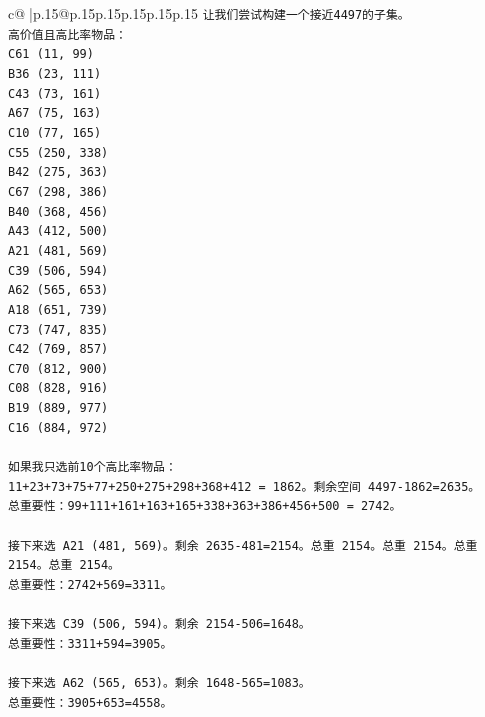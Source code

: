 \documentclass{article}
\begin{document}
{\begin{supertabular}{c@{$\;$}|p{.15\linewidth}@{}p{.15\linewidth}p{.15\linewidth}p{.15\linewidth}p{.15\linewidth}p{.15\linewidth}}
{{{\texttt{让我们尝试构建一个接近4497的子集。} \\
\texttt{高价值且高比率物品：} \\
\texttt{C61 (11, 99)} \\
\texttt{B36 (23, 111)} \\
\texttt{C43 (73, 161)} \\
\texttt{A67 (75, 163)} \\
\texttt{C10 (77, 165)} \\
\texttt{C55 (250, 338)} \\
\texttt{B42 (275, 363)} \\
\texttt{C67 (298, 386)} \\
\texttt{B40 (368, 456)} \\
\texttt{A43 (412, 500)} \\
\texttt{A21 (481, 569)} \\
\texttt{C39 (506, 594)} \\
\texttt{A62 (565, 653)} \\
\texttt{A18 (651, 739)} \\
\texttt{C73 (747, 835)} \\
\texttt{C42 (769, 857)} \\
\texttt{C70 (812, 900)} \\
\texttt{C08 (828, 916)} \\
\texttt{B19 (889, 977)} \\
\texttt{C16 (884, 972)} \\
\\ 
\texttt{如果我只选前10个高比率物品：} \\
\texttt{11+23+73+75+77+250+275+298+368+412 = 1862。剩余空间 4497{-}1862=2635。} \\
\texttt{总重要性：99+111+161+163+165+338+363+386+456+500 = 2742。} \\
\\ 
\texttt{接下来选 A21 (481, 569)。剩余 2635{-}481=2154。总重 2154。总重 2154。总重 2154。总重 2154。} \\
\texttt{总重要性：2742+569=3311。} \\
\\ 
\texttt{接下来选 C39 (506, 594)。剩余 2154{-}506=1648。} \\
\texttt{总重要性：3311+594=3905。} \\
\\ 
\texttt{接下来选 A62 (565, 653)。剩余 1648{-}565=1083。} \\
\texttt{总重要性：3905+653=4558。} \\
\\ 
}}}
\end{supertabular}}
\end{document}
